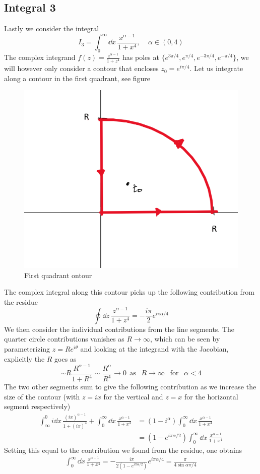 \documentclass[a4paper,12pt]{article}
\begin{document}
\subsection*{Integral 3}
Lastly we consider the integral
\begin{equation}
I_3=\int_{0}^{\infty}\dd x\,\frac{x^{\alpha-1}}{1+x^4},~~~~~\alpha\in(0,4)
\end{equation}
The complex integrand $f(z)=\frac{z^{\alpha-1}}{1+z^4}$ has poles at $\{e^{3\pi/4},e^{\pi/4},e^{-3\pi/4},e^{-\pi/4}\}$, we will however only consider a contour that encloses $z_0=e^{i\pi/4}$. Let us integrate along a contour in the first quadrant, see figure
\begin{figure}[H]
	\centering
	\includegraphics[width=0.5\linewidth]{cont}
	\caption{First quadrant ontour}
	\label{fig:rectangle}
\end{figure}
The complex integral along this contour picks up the following contribution from the residue
\begin{equation}
\oint\dd z\,\frac{z^{\alpha-1}}{1+z^4}=-\frac{i\pi}{2}e^{i\pi\alpha/4} 
\end{equation}
We then consider the individual contributions from the line segments. The quarter circle contributions vanishes as $R\to\infty$, which can be seen by parameterizing $z=Re^{i\theta}$ and looking at the integrand with the Jacobian, explicitly the $R$ goes as
\begin{equation}
\sim R\frac{R^{\alpha-1}}{1+R^{4}}\sim \frac{R^{\alpha}}{R^4}\to 0~~\text{as }~~R\to\infty ~~\text{ for } ~~ \alpha < 4
\end{equation}
The two other segments sum to give the following contribution as we increase the size of the contour (with $z=ix$ for the vertical and $z=x$ for the horizontal segment respectively)
\begin{equation}
\begin{aligned}
\int_\infty^0 i \dd x\,\frac{(ix)^{\alpha-1}}{1+(ix)^4}+\int^\infty_0  \dd x\,\frac{x^{\alpha-1}}{1+x^4}&=(1-i^\alpha)\int^\infty_0  \dd x\,\frac{x^{\alpha-1}}{1+x^4}\\
&=(1-e^{i\pi \alpha/2})\int^\infty_0  \dd x\,\frac{x^{\alpha-1}}{1+x^4}
\end{aligned}
\end{equation}
Setting this equal to the contribution we found from the residue, one obtains
\begin{equation}
\begin{aligned}
\int^\infty_0  \dd x\,\frac{x^{\alpha-1}}{1+x^4}=-\frac{i\pi}{2(1-e^{i\pi \alpha/2})}e^{i\pi\alpha/4}=\frac{\pi}{4\sin \alpha\pi/4}
\end{aligned}
\end{equation}
\end{document}
